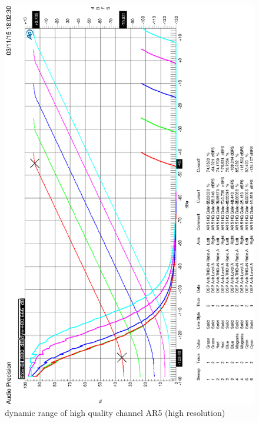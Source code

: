 \documentclass[11pt]{report}
\begin{document}
\begin{appendix}
\begin{figure}[htbp]
\begin{center}
\includegraphics[width=14cm,keepaspectratio=true]{HQTHDAR5HQdBVergleich}
\caption{dynamic range of high quality channel AR5 (high resolution)}
\label{Abb.:1}
\end{center}
\end{figure}









\printnomenclature

\end{appendix}


\nocite{mseifter88,pmandl97,weiss92,weiss92a,ginthoer93}

\newpage
\addtocounter{page}{1}
\addtocounter{page}{-1}





%
\end{document}
